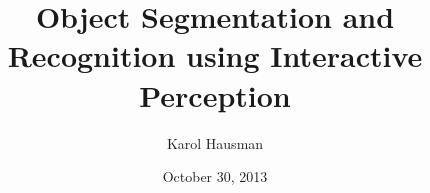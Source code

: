 \newcommand{\thedoctype}{Master's Thesis in Informatik\xspace}
\newcommand{\thetitle}{Object Segmentation and Recognition using Interactive Perception\xspace}
\newcommand{\thetitleGer}{Objektsegmentierung und -erkennung mittels interaktiver Wahrnehmung\xspace}
\newcommand{\theauthor}{Karol Hausman\xspace}
\newcommand{\theplace}{Munich\xspace}
\newcommand{\thedate}{October 30, 2013\xspace}
\newcommand{\thesupervisor}{Dejan Pangercic}
\newcommand{\thesecsupervisor}{, Dr. J{\"u}rgen Sturm}
\newcommand{\theadvisor}{Prof. Dr. Daniel Cremers}

\date{\thedate}
\title{\thetitle}
\author{\theauthor}

\newcommand{\footertext}{}
